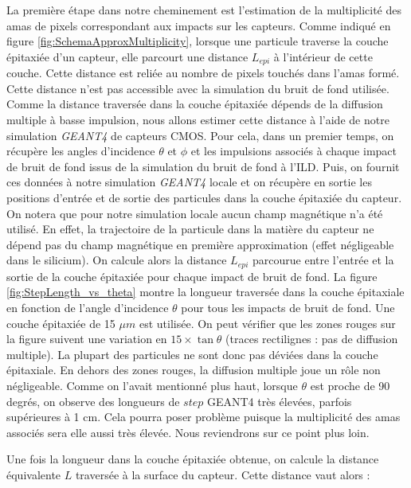   La premi\`ere \'etape dans notre cheminement est l'estimation de la multiplicit\'e des amas de pixels correspondant aux impacts sur les capteurs. Comme indiqu\'e en figure \ref{fig:SchemaApproxMultiplicity}, lorsque une particule traverse la couche \'epitaxi\'ee d'un capteur, elle parcourt une distance $L_{epi}$ \`a l'int\'erieur de cette couche. Cette distance est reli\'ee au nombre de pixels touch\'es dans l'amas form\'e. Cette distance n'est pas accessible avec la simulation du bruit de fond utilis\'ee. Comme la distance travers\'ee dans la couche \'epitaxi\'ee d\'epends de la diffusion multiple \`a basse impulsion, nous allons estimer cette distance \`a l'aide de notre simulation \textit{GEANT4} de capteurs CMOS. Pour cela, dans un premier temps, on r\'ecup\`ere les angles d'incidence $\theta$ et $\phi$ et les impulsions associ\'es \`a chaque impact de bruit de fond issus de la simulation du bruit de fond \`a l'ILD. Puis, on fournit ces donn\'ees \`a notre simulation \textit{GEANT4} locale et on r\'ecup\`ere en sortie les positions d'entr\'ee et de sortie des particules dans la couche \'epitaxi\'ee du capteur. On notera que pour notre simulation locale aucun champ magn\'etique n'a \'et\'e utilis\'e. En effet, la trajectoire de la particule dans la mati\`ere du capteur ne d\'epend pas du champ magn\'etique en premi\`ere approximation (effet n\'egligeable dans le silicium). On calcule alors la distance $L_{epi}$ parcourue entre l'entr\'ee et la sortie de la couche \'epitaxi\'ee pour chaque impact de bruit de fond. La figure \ref{fig:StepLength_vs_theta} montre la longueur travers\'ee dans la couche \'epitaxiale en fonction de l'angle d'incidence $\theta$ pour tous les impacts de bruit de fond. Une couche \'epitaxi\'ee de 15 $\mu m$ est utilis\'ee. On peut v\'erifier que les zones rouges sur la figure suivent une variation en $15 \times \tan{\theta}$ (traces rectilignes : pas de diffusion multiple). La plupart des particules ne sont donc pas d\'evi\'ees dans la couche \'epitaxiale. En dehors des zones rouges, la diffusion multiple joue un r\^ole non n\'egligeable. Comme on l'avait mentionn\'e plus haut, lorsque $\theta$ est proche de 90 degr\'es, on observe des longueurs de $step$ GEANT4 tr\`es \'elev\'ees, parfois sup\'erieures \`a 1 cm. Cela pourra poser probl\`eme puisque la multiplicit\'e des amas associ\'es sera elle aussi tr\`es \'elev\'ee. Nous reviendrons sur ce point plus loin.
  
  \medskip

  Une fois la longueur dans la couche \'epitaxi\'ee obtenue, on calcule la distance \'equivalente $L$ travers\'ee \`a la surface du capteur. Cette distance vaut alors :
  
